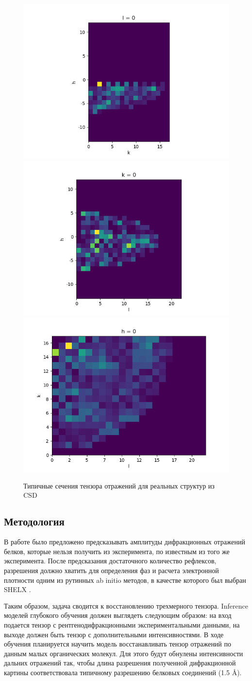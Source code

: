 \documentclass[a4paper,12pt]{article}
\begin{document}
{\begin{figure}[ht!]
            \includegraphics[width=.3\textwidth]{hk_plane_l_0.png}\hfill
            \includegraphics[width=.3\textwidth]{hl_plane_k_0.png}\hfill
            \includegraphics[width=.3\textwidth]{kl_plane_h_0.png}
            \caption{Типичные сечения тензора отражений для реальных структур из CSD}
            \label{locally}
\end{figure}


\subsection*{Методология}

В работе было предложено предсказывать амплитуды дифракционных отражений белков, которые нельзя получить из эксперимента, по известным из того же эксперимента. После предсказания достаточного количество рефлексов, разрешения должно хватить для определения фаз и расчета электронной плотности одним из рутинных ab initio методов, в качестве которого был выбран SHELX \cite{shelx}.

Таким образом, задача сводится к восстановлению трехмерного тензора. Inference моделей глубокого обучения должен выглядеть следующим образом: на вход подается тензор с рентгенодифракционными экспериментальными данными, на выходе должен быть тензор с дополнительными интенсивностями. В ходе обучения планируется научить модель восстанавливать тензор отражений по данным малых органических молекул. Для этого будут обнулены интенсивности дальних отражений так, чтобы длина разрешения полученной дифракционной картины соответствовала типичному разрешению белковых соединений (1.5 Å).

}
\end{document}
